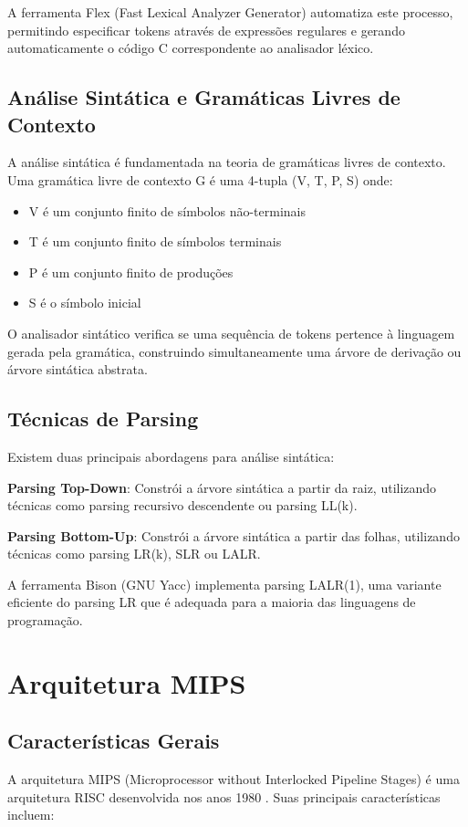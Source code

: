 \documentclass[
	12pt,				%
	oneside,
	a4paper,			%
	english,			%
	french,				%
	spanish,			%
	brazil,				%
	]{abntex2}
\begin{document}
A ferramenta Flex (Fast Lexical Analyzer Generator) automatiza este processo, permitindo especificar tokens através de expressões regulares e gerando automaticamente o código C correspondente ao analisador léxico.

\subsection{Análise Sintática e Gramáticas Livres de Contexto}
A análise sintática é fundamentada na teoria de gramáticas livres de contexto. Uma gramática livre de contexto G é uma 4-tupla (V, T, P, S) onde:
\begin{itemize}
    \item V é um conjunto finito de símbolos não-terminais
    \item T é um conjunto finito de símbolos terminais
    \item P é um conjunto finito de produções
    \item S é o símbolo inicial
\end{itemize}

O analisador sintático verifica se uma sequência de tokens pertence à linguagem gerada pela gramática, construindo simultaneamente uma árvore de derivação ou árvore sintática abstrata.

\subsection{Técnicas de Parsing}
Existem duas principais abordagens para análise sintática:

\textbf{Parsing Top-Down}: Constrói a árvore sintática a partir da raiz, utilizando técnicas como parsing recursivo descendente ou parsing LL(k).

\textbf{Parsing Bottom-Up}: Constrói a árvore sintática a partir das folhas, utilizando técnicas como parsing LR(k), SLR ou LALR.

A ferramenta Bison (GNU Yacc) implementa parsing LALR(1), uma variante eficiente do parsing LR que é adequada para a maioria das linguagens de programação.

\section{Arquitetura MIPS}

\subsection{Características Gerais}
A arquitetura MIPS (Microprocessor without Interlocked Pipeline Stages) é uma arquitetura RISC desenvolvida nos anos 1980 \cite{Patterson2013}. Suas principais características incluem:
\end{document}

